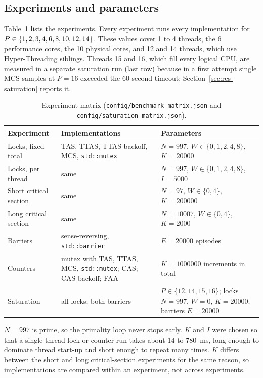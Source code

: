 \subsection{Experiments and parameters}\label{sec:matrix}

Table~\ref{tab:matrix} lists the experiments. Every experiment runs every implementation for $P\in\{1, 2, 3, 4, 6, 8, 10, 12, 14\}$. These values cover 1 to 4 threads, the 6 performance cores, the 10 physical cores, and 12 and 14 threads, which use Hyper-Threading siblings. Threads 15 and 16, which fill every logical CPU, are measured in a separate saturation run (last row) because in a first attempt single MCS samples at $P=16$ exceeded the 60-second timeout; Section~\ref{sec:res-saturation} reports it.

\begin{table}[H]
\centering
\small
\caption[Experiment matrix]{Experiment matrix (\texttt{config/benchmark\_matrix.json} and \texttt{config/saturation\_matrix.json}).}\label{tab:matrix}
\begin{tabular}{|>{\raggedright\arraybackslash}p{}|>{\raggedright\arraybackslash}p{}|>{\raggedright\arraybackslash}p{}|}
\hline
\textbf{Experiment} & \textbf{Implementations} & \textbf{Parameters} \\ \hline
Locks, fixed total & TAS, TTAS, TTAS-backoff, MCS, \texttt{std::mutex} & $N=997$, $W\in\{0,1,2,4,8\}$, $K=20000$ \\ \hline
Locks, per thread & same & $N=997$, $W\in\{0,1,2,4,8\}$, $I=5000$ \\ \hline
Short critical section & same & $N=97$, $W\in\{0,4\}$, $K=200000$ \\ \hline
Long critical section & same & $N=10007$, $W\in\{0,4\}$, $K=2000$ \\ \hline
Barriers & sense-reversing, \texttt{std::barrier} & $E=20000$ episodes \\ \hline
Counters & mutex with TAS, TTAS, MCS, \texttt{std::mutex}; CAS; CAS-backoff; FAA & $K=1000000$ increments in total \\ \hline
Saturation & all locks; both barriers & $P\in\{12,14,15,16\}$; locks $N=997$, $W=0$, $K=20000$; barriers $E=20000$ \\ \hline
\end{tabular}
\end{table}

$N=997$ is prime, so the primality loop never stops early. $K$ and $I$ were chosen so that a single-thread lock or counter run takes about 14 to 780~ms, long enough to dominate thread start-up and short enough to repeat many times. $K$ differs between the short and long critical-section experiments for the same reason, so implementations are compared within an experiment, not across experiments.

